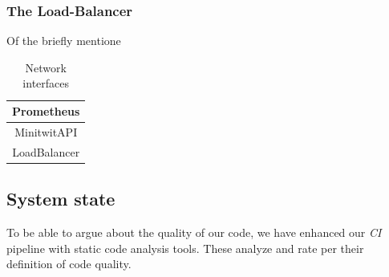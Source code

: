 \subsubsection{The Load-Balancer}
Of the briefly mentione
\begin{table}[h!]
    \centering
    \begin{tabular}{|c|} \hline
         Prometheus \\ \hline
         MinitwitAPI \\ \hline
         LoadBalancer \\ \hline
    \end{tabular}
    \caption{Network interfaces}
    \label{tab:my_label}
\end{table}

\subsection{System state}
\label{subsec:system_state}
To be able to argue about the quality of our code, we have enhanced our \textit{CI} pipeline with static code analysis tools. These analyze and rate \mini per their definition of code quality.

